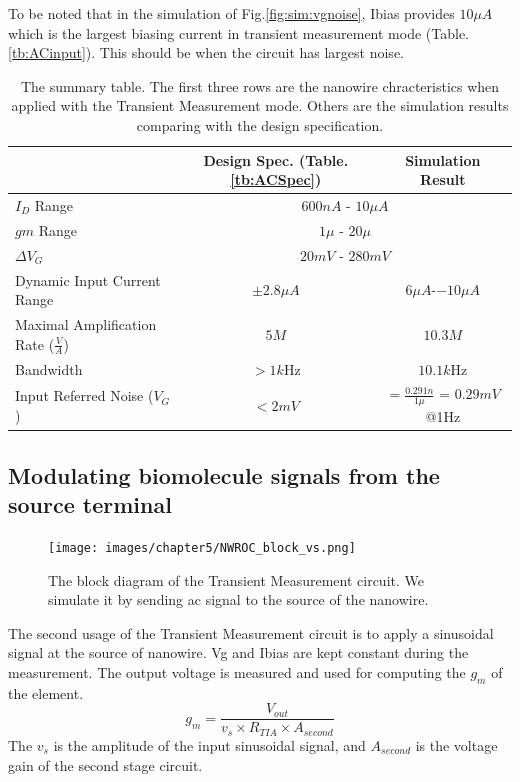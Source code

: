{To be noted that in the simulation of Fig.\ref{fig:sim:vgnoise}, Ibias provides $10\mu A$ which is the largest biasing current in transient measurement mode (Table.\ref{tb:ACinput}).
This should be when the circuit has largest noise.
\begin{table}[!htbp]
    {\fontfamily{}\fontsize{10}{14}\selectfont
    \centering
    \begin{tabular}{l|c|c}
        & Design Spec. (Table.\ref{tb:ACSpec}) & Simulation Result \\
        \hline
        \hline
        $I_D$ Range & \multicolumn{2}{c}{$600n A$ - $10\mu A$}  \\
        \hline
        $gm$ Range & \multicolumn{2}{c}{$1\mu$ - $20\mu$}  \\
        \hline
        $\Delta V_G $ & \multicolumn{2}{c}{$20m V$ - $280m V$}  \\
        \hline
        Dynamic Input Current Range & $\pm 2.8\mu A$ & $6\mu A$-$-10\mu A$ \\
        \hline
        Maximal Amplification Rate ($\frac{V}{A}$)& $5M$ & $10.3M$\\
        \hline
        Bandwidth & $> 1k$Hz & $10.1k$Hz \\
        \hline
        Input Referred Noise ($V_G$) & $< 2m V$ & $ = \frac{0.291n}{1\mu}$ = $0.29m V$ @1Hz
    \end{tabular}
    \caption{The summary table. The first three rows are the nanowire chracteristics when applied with the Transient Measurement mode.
    Others are the simulation results comparing with the design specification.}
    \label{tb:sim:vg}
    }
\end{table}

\subsection{Modulating biomolecule signals from the source terminal}
\begin{figure}[!htbp]
    \centering
        \texttt{[image: images/chapter5/NWROC\_block\_vs.png]}
    \caption{The block diagram of the Transient Measurement circuit. We simulate it by sending ac signal to the source of the nanowire.}
    \label{fig:Nblockvs}
\end{figure}

The second usage of the Transient Measurement circuit is to apply a sinusoidal signal at the source of nanowire.
Vg and Ibias are kept constant during the measurement.
The output voltage is measured and used for computing the $g_m$ of the element.
\begin{equation}
    g_m = \frac{V_{out}}{v_s \times R_{TIA} \times A_{second}}
\end{equation}
The $v_s$ is the amplitude of the input sinusoidal signal, and $A_{second}$ is the voltage gain of the second stage circuit.

}
